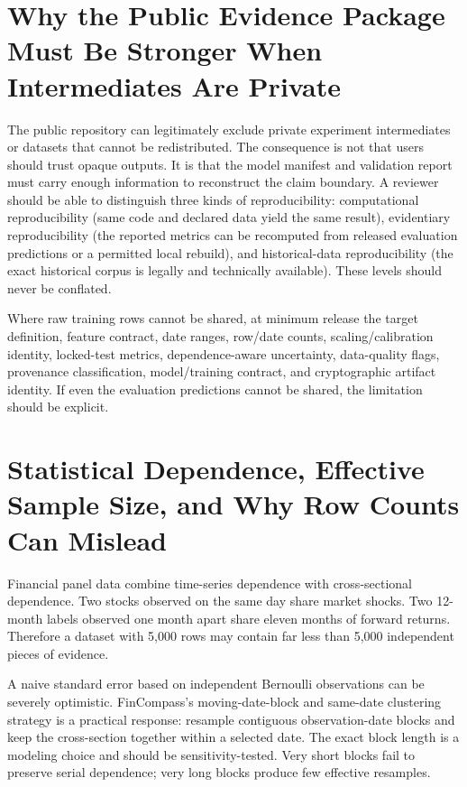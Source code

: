 \documentclass[11pt]{article}
\begin{document}
\section{Why the Public Evidence Package Must Be Stronger When Intermediates Are Private}
The public repository can legitimately exclude private experiment intermediates or datasets that cannot be redistributed. The consequence is not that users should trust opaque outputs. It is that the model manifest and validation report must carry enough information to reconstruct the claim boundary. A reviewer should be able to distinguish three kinds of reproducibility: computational reproducibility (same code and declared data yield the same result), evidentiary reproducibility (the reported metrics can be recomputed from released evaluation predictions or a permitted local rebuild), and historical-data reproducibility (the exact historical corpus is legally and technically available). These levels should never be conflated.

Where raw training rows cannot be shared, at minimum release the target definition, feature contract, date ranges, row/date counts, scaling/calibration identity, locked-test metrics, dependence-aware uncertainty, data-quality flags, provenance classification, model/training contract, and cryptographic artifact identity. If even the evaluation predictions cannot be shared, the limitation should be explicit.

\section{Statistical Dependence, Effective Sample Size, and Why Row Counts Can Mislead}
Financial panel data combine time-series dependence with cross-sectional dependence. Two stocks observed on the same day share market shocks. Two 12-month labels observed one month apart share eleven months of forward returns. Therefore a dataset with 5,000 rows may contain far less than 5,000 independent pieces of evidence.

A naive standard error based on independent Bernoulli observations can be severely optimistic. FinCompass's moving-date-block and same-date clustering strategy is a practical response: resample contiguous observation-date blocks and keep the cross-section together within a selected date. The exact block length is a modeling choice and should be sensitivity-tested. Very short blocks fail to preserve serial dependence; very long blocks produce few effective resamples.
\end{document}
